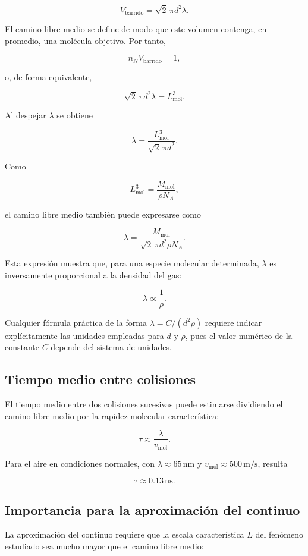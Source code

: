 $$
V_{\mathrm{barrido}}
=\sqrt{2}\,\pi d^2\lambda.
$$

El camino libre medio se define de modo que este volumen contenga, en
promedio, una molécula objetivo. Por tanto,

$$
n_N V_{\mathrm{barrido}}=1,
$$

o, de forma equivalente,

$$
\sqrt{2}\,\pi d^2\lambda=L_{\mathrm{mol}}^3.
$$

Al despejar $\lambda$ se obtiene

$$
\boxed{
\lambda
=\frac{L_{\mathrm{mol}}^3}{\sqrt{2}\,\pi d^2}
}.
$$

Como

$$
L_{\mathrm{mol}}^3
=\frac{M_{\mathrm{mol}}}{\rho N_A},
$$

el camino libre medio también puede expresarse como

$$
\boxed{
\lambda
=\frac{M_{\mathrm{mol}}}
{\sqrt{2}\,\pi d^2\rho N_A}
}.
$$

Esta expresión muestra que, para una especie molecular determinada,
$\lambda$ es inversamente proporcional a la densidad del gas:

$$
\lambda\propto\frac{1}{\rho}.
$$

Cualquier fórmula práctica de la forma $\lambda=C/(d^2\rho)$ requiere indicar
explícitamente las unidades empleadas para $d$ y $\rho$, pues el valor numérico
de la constante $C$ depende del sistema de unidades.

\subsection{Tiempo medio entre colisiones}

El tiempo medio entre dos colisiones sucesivas puede estimarse dividiendo el
camino libre medio por la rapidez molecular característica:

$$
\tau\approx\frac{\lambda}{v_{\mathrm{mol}}}.
$$

Para el aire en condiciones normales, con
$\lambda\approx65\,\mathrm{nm}$ y
$v_{\mathrm{mol}}\approx500\,\mathrm{m/s}$, resulta

$$
\tau\approx0.13\,\mathrm{ns}.
$$

\subsection{Importancia para la aproximación del continuo}

La aproximación del continuo requiere que la escala característica $L$ del
fenómeno estudiado sea mucho mayor que el camino libre medio:

